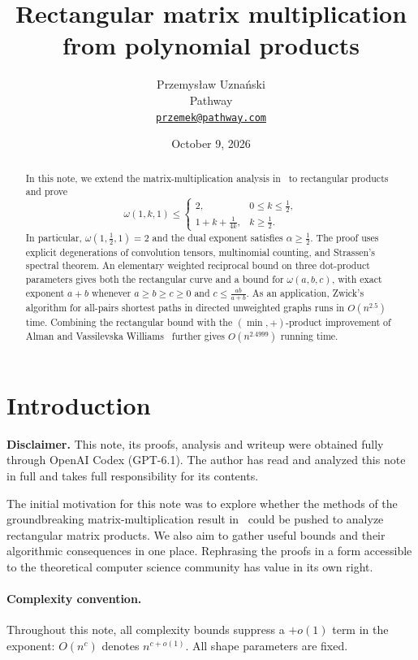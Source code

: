 \documentclass[11pt]{article}
\title{Rectangular matrix multiplication from polynomial products}
\author{Przemysław Uznański\\[2pt]\small Pathway\\[2pt]
\small\href{mailto:przemek@pathway.com}{\texttt{przemek@pathway.com}}}
\date{October 9, 2026}
\begin{document}
\maketitle

\begin{abstract}
In this note, we extend the matrix-multiplication analysis in~\cite{openai-2026-matrix-nine-fourths} to
rectangular products and prove
\[
 \omega(1,k,1)\le
 \begin{cases}
 2,&0\le k\le \frac{1}{2},\\
 1+k+\frac{1}{4k},&k\ge \frac{1}{2}.
 \end{cases}
\]
In particular, $\omega(1,\frac{1}{2},1)=2$ and the dual exponent satisfies
$\alpha\ge \frac{1}{2}$. The proof uses explicit degenerations of convolution tensors,
multinomial counting, and Strassen's spectral theorem.
An elementary weighted reciprocal bound on three dot-product parameters gives both the
rectangular curve and a bound for $\omega(a,b,c)$, with exact exponent
$a+b$ whenever $a\ge b\ge c\ge0$ and $c\le\frac{ab}{a+b}$.
As an application, Zwick's algorithm
\cite{zwick-2002-bridging-sets} for all-pairs shortest paths in directed
unweighted graphs runs in $O(n^{2.5})$ time.
Combining the rectangular bound with the $(\min,+)$-product improvement
of Alman and Vassilevska Williams~\cite{alman-williams-2026} further gives
$O(n^{2.4999})$ running time.
\end{abstract}

\section{Introduction}\label{sec:statement}

\noindent\textbf{Disclaimer.} This note, its proofs, analysis and writeup
were obtained fully through OpenAI Codex (GPT-6.1). The author has read and analyzed this note in full
and takes full responsibility for its contents.

The initial motivation for this note was to explore whether the methods
of the groundbreaking matrix-multiplication result
in~\cite{openai-2026-matrix-nine-fourths} could be pushed to analyze
rectangular matrix products. We also aim to gather useful bounds and
their algorithmic consequences in one place. Rephrasing the proofs in
a form accessible to the theoretical computer science community has
value in its own right.

\paragraph{Complexity convention.}
Throughout this note, all complexity bounds suppress a $+o(1)$ term
in the exponent: $O(n^c)$ denotes $n^{c+o(1)}$. All shape parameters
are fixed.
\end{document}

